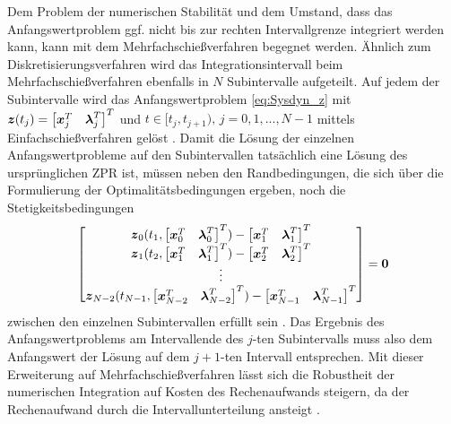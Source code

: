 Dem Problem der numerischen Stabilität und dem Umstand, dass das Anfangswertproblem ggf. nicht bis zur rechten Intervallgrenze integriert werden kann, kann mit dem Mehrfachschießverfahren begegnet werden. Ähnlich zum Diskretisierungsverfahren wird das Integrationsintervall beim Mehrfachschießverfahren ebenfalls in $N$ Subintervalle aufgeteilt. Auf jedem der Subintervalle wird das Anfangswertproblem \eqref{eq:Sysdyn_z} mit $\boldsymbol{z}(t_j) = \begin{bmatrix}\boldsymbol{x}_j^T & \boldsymbol{\lambda}_j^T\end{bmatrix}^T$ und $t\in[t_j, t_{j+1}),\,j = 0,1,...,N-1$ mittels Einfachschießverfahren gelöst \cite{Gerdts.2010}. Damit die Lösung der einzelnen Anfangswertprobleme auf den Subintervallen tatsächlich eine Lösung des ursprünglichen \gls{ZPR} ist, müssen neben den Randbedingungen, die sich über die Formulierung der Optimalitätsbedingungen ergeben, noch die Stetigkeitsbedingungen 
\begin{equation}
	\begin{bmatrix}
	\boldsymbol{z}_0(t_1,\begin{bmatrix}\boldsymbol{x}_0^T & \boldsymbol{\lambda}_0^T\end{bmatrix}^T) - \begin{bmatrix}\boldsymbol{x}_1^T & \boldsymbol{\lambda}_1^T\end{bmatrix}^T \\
	\boldsymbol{z}_1(t_2,\begin{bmatrix}\boldsymbol{x}_1^T & \boldsymbol{\lambda}_1^T\end{bmatrix}^T) - \begin{bmatrix}\boldsymbol{x}_2^T & \boldsymbol{\lambda}_2^T\end{bmatrix}^T \\
	\vdots \\
	\boldsymbol{z}_{N-2}(t_{N-1},\begin{bmatrix}\boldsymbol{x}_{N-2}^T & \boldsymbol{\lambda}_{N-2}^T\end{bmatrix}^T) - \begin{bmatrix}\boldsymbol{x}_{N-1}^T & \boldsymbol{\lambda}_{N-1}^T\end{bmatrix}^T
	\end{bmatrix} = \boldsymbol{0}
\end{equation}
zwischen den einzelnen Subintervallen erfüllt sein \cite{Gerdts.2010}. Das Ergebnis des Anfangswertproblems am Intervallende des $j$-ten Subintervalls muss also dem Anfangswert der Lösung auf dem $j+1$-ten Intervall entsprechen. Mit dieser Erweiterung auf Mehrfachschießverfahren lässt sich die Robustheit der numerischen Integration auf Kosten des Rechenaufwands steigern, da der Rechenaufwand durch die Intervallunterteilung ansteigt \cite{Betts.1998}.
